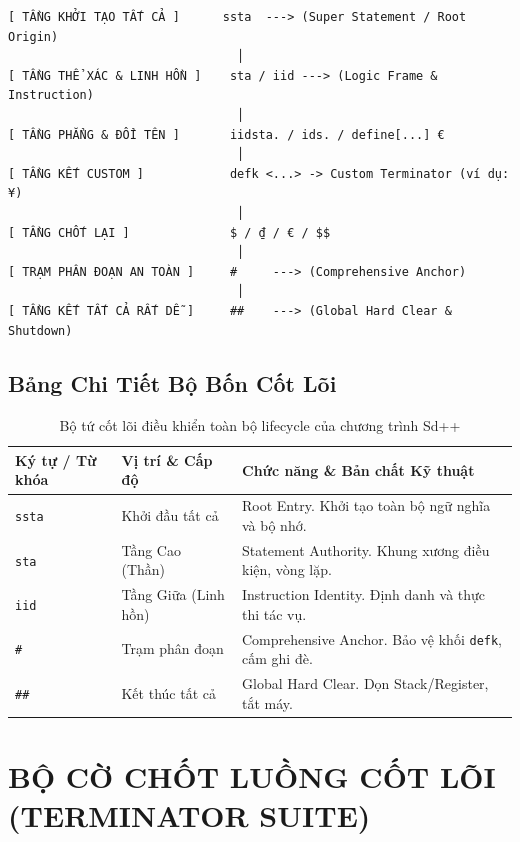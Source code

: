 \documentclass[11pt, a4paper]{article}
\begin{document}
\begin{verbatim}
[ TẦNG KHỞI TẠO TẤT CẢ ]      ssta  ---> (Super Statement / Root Origin)
                                │
[ TẦNG THỂ XÁC & LINH HỒN ]    sta / iid ---> (Logic Frame & Instruction)
                                │
[ TẦNG PHẲNG & ĐỔI TÊN ]       iidsta. / ids. / define[...] €
                                │
[ TẦNG KẾT CUSTOM ]            defk <...> -> Custom Terminator (ví dụ: ¥)
                                │
[ TẦNG CHỐT LẠI ]              $ / ₫ / € / $$
                                │
[ TRẠM PHÂN ĐOẠN AN TOÀN ]     #     ---> (Comprehensive Anchor)
                                │
[ TẦNG KẾT TẤT CẢ RẤT DỄ ]     ##    ---> (Global Hard Clear & Shutdown)
\end{verbatim}

\subsection{Bảng Chi Tiết Bộ Bốn Cốt Lõi}
\begin{table}[htbp]
\centering
\begin{tabular}{@{}lll@{}}
\toprule
\textbf{Ký tự / Từ khóa} & \textbf{Vị trí \& Cấp độ} & \textbf{Chức năng \& Bản chất Kỹ thuật} \\ \midrule
\texttt{ssta} & Khởi đầu tất cả & Root Entry. Khởi tạo toàn bộ ngữ nghĩa và bộ nhớ. \\
\texttt{sta} & Tầng Cao (Thần) & Statement Authority. Khung xương điều kiện, vòng lặp. \\
\texttt{iid} & Tầng Giữa (Linh hồn) & Instruction Identity. Định danh và thực thi tác vụ. \\
\texttt{\#} & Trạm phân đoạn & Comprehensive Anchor. Bảo vệ khối \texttt{defk}, cấm ghi đè. \\
\texttt{\#\#} & Kết thúc tất cả & Global Hard Clear. Dọn Stack/Register, tắt máy. \\ \bottomrule
\end{tabular}
\caption{Bộ tứ cốt lõi điều khiển toàn bộ lifecycle của chương trình Sd++}
\end{table}

\section{BỘ CỜ CHỐT LUỒNG CỐT LÕI (TERMINATOR SUITE)}
\end{document}
